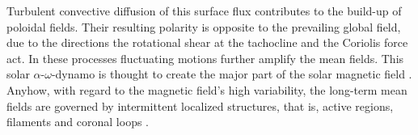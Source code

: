 Turbulent convective diffusion of this surface flux contributes to the build-up of poloidal fields. Their resulting polarity is opposite to the prevailing global field, due to the directions the rotational shear at the tachocline and the Coriolis force act. In these processes fluctuating motions further amplify the mean fields. This solar $\alpha$-$\omega$-dynamo is thought to create the major part of the solar magnetic field \citep{Miesch2005}. Anyhow, with regard to the magnetic field's high variability, the long-term mean fields are governed by intermittent localized structures, that is, active regions, filaments and coronal loops \citep{Miesch2005}.\\	%


